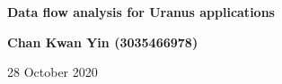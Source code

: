 \begin{titlepage}
	\begin{center}
		\vspace*{1em}
		\Huge
		\textbf{Data flow analysis for Uranus applications}

		\Large
		\vspace{1.5em}
		\textbf{Chan Kwan Yin (3035466978)}

		\vspace{0.5em}
		28 October 2020
	\end{center}
\end{titlepage}
